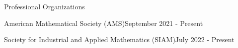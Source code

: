 \begin{rSection}{Professional Organizations}

\begin{rSubsectionSmall}{American Mathematical Society (AMS)}{September 2021 - Present}
\end{rSubsectionSmall}

\smallskip

\begin{rSubsectionSmall}{Society for Industrial and Applied Mathematics (SIAM)}{July 2022 - Present}
\end{rSubsectionSmall}

\end{rSection}